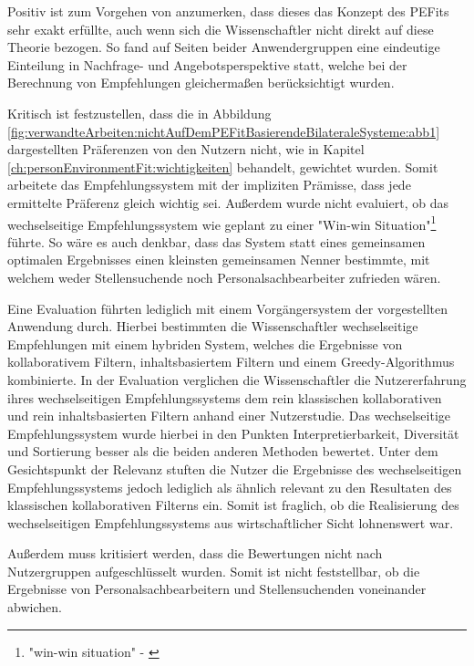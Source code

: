 Positiv ist zum Vorgehen von \textcite[S. 1ff.]{wenxing:2015} anzumerken, dass dieses das Konzept des \acp{PEFit} sehr exakt erfüllte, auch wenn sich die Wissenschaftler nicht direkt auf diese Theorie bezogen. So fand auf Seiten beider Anwendergruppen eine eindeutige Einteilung in Nachfrage- und Angebotsperspektive statt, welche bei der Berechnung von Empfehlungen gleichermaßen berücksichtigt wurden.

Kritisch ist festzustellen, dass die in Abbildung \ref{fig:verwandteArbeiten:nichtAufDemPEFitBasierendeBilateraleSysteme:abb1} dargestellten Präferenzen von den Nutzern nicht, wie in Kapitel \ref{ch:personEnvironmentFit:wichtigkeiten} behandelt, gewichtet wurden. Somit arbeitete das Empfehlungssystem mit der impliziten Prämisse, dass jede ermittelte Präferenz gleich wichtig sei. Außerdem wurde nicht evaluiert, ob das wechselseitige Empfehlungssystem wie geplant zu einer "Win-win Situation"\footnote{"win-win situation" - \textcite[S. 3, Z. 45f.]{wenxing:2015}} \cite[S. 3, Z. 45f.]{wenxing:2015} führte. So wäre es auch denkbar, dass das System statt eines gemeinsamen optimalen Ergebnisses einen kleinsten gemeinsamen Nenner bestimmte, mit welchem weder Stellensuchende noch Personalsachbearbeiter zufrieden wären.

Eine Evaluation führten lediglich \textcite[S. 1ff.]{hong:2013b} mit einem Vorgängersystem der vorgestellten Anwendung durch. Hierbei bestimmten die Wissenschaftler wechselseitige Empfehlungen mit einem hybriden System, welches die Ergebnisse von kollaborativem Filtern, inhaltsbasiertem Filtern und einem Greedy-Algorithmus kombinierte. In der Evaluation verglichen die Wissenschaftler die Nutzererfahrung ihres wechselseitigen Empfehlungssystems dem rein klassischen kollaborativen und rein inhaltsbasierten Filtern anhand einer Nutzerstudie. Das wechselseitige Empfehlungssystem wurde hierbei in den Punkten Interpretierbarkeit, Diversität und Sortierung besser als die beiden anderen Methoden bewertet. Unter dem Gesichtspunkt der Relevanz stuften die Nutzer die Ergebnisse des wechselseitigen Empfehlungssystems jedoch lediglich als ähnlich relevant zu den Resultaten des klassischen kollaborativen Filterns ein. Somit ist fraglich, ob die Realisierung des wechselseitigen Empfehlungssystems aus wirtschaftlicher Sicht lohnenswert war.

Außerdem muss kritisiert werden, dass die Bewertungen nicht nach Nutzergruppen aufgeschlüsselt wurden. Somit ist nicht feststellbar, ob die Ergebnisse von Personalsachbearbeitern und Stellensuchenden voneinander abwichen.


